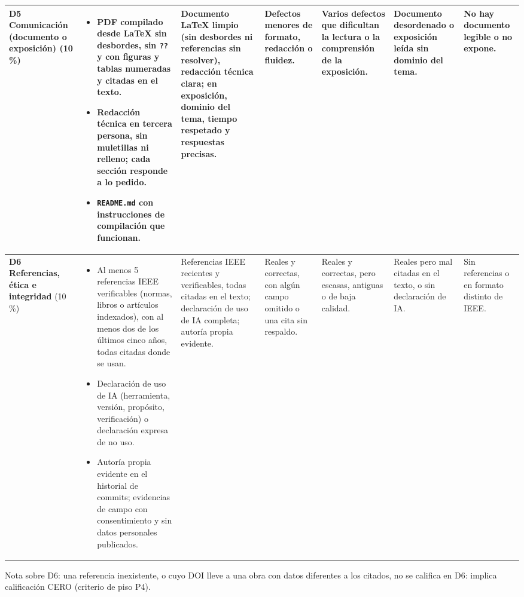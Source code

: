 \documentclass[11pt]{article}
\begin{document}
\begin{landscape}
{\begin{longtable}{|L{2.4cm}|L{5.6cm}|L{3.1cm}|L{2.8cm}|L{2.8cm}|L{2.7cm}|L{2.1cm}|}
	\textbf{D5 Comunicación (documento o exposición)} (10\,\%) & \begin{itemize}[leftmargin=9pt,itemsep=0pt,topsep=0pt,parsep=0pt,partopsep=0pt,after=\vspace{-\baselineskip}]\item PDF compilado desde \LaTeX{} sin desbordes, sin \texttt{??} y con figuras y tablas numeradas y citadas en el texto.\item Redacción técnica en tercera persona, sin muletillas ni relleno; cada sección responde a lo pedido.\item \texttt{README.md} con instrucciones de compilación que funcionan.\end{itemize} & Documento \LaTeX{} limpio (sin desbordes ni referencias sin resolver), redacción técnica clara; en exposición, dominio del tema, tiempo respetado y respuestas precisas. & Defectos menores de formato, redacción o fluidez. & Varios defectos que dificultan la lectura o la comprensión de la exposición. & Documento desordenado o exposición leída sin dominio del tema. & No hay documento legible o no expone.\\
	\hline
	\textbf{D6 Referencias, ética e integridad} (10\,\%) & \begin{itemize}[leftmargin=9pt,itemsep=0pt,topsep=0pt,parsep=0pt,partopsep=0pt,after=\vspace{-\baselineskip}]\item Al menos 5 referencias IEEE verificables (normas, libros o artículos indexados), con al menos dos de los últimos cinco años, todas citadas donde se usan.\item Declaración de uso de IA (herramienta, versión, propósito, verificación) o declaración expresa de no uso.\item Autoría propia evidente en el historial de commits; evidencias de campo con consentimiento y sin datos personales publicados.\end{itemize} & Referencias IEEE recientes y verificables, todas citadas en el texto; declaración de uso de IA completa; autoría propia evidente. & Reales y correctas, con algún campo omitido o una cita sin respaldo. & Reales y correctas, pero escasas, antiguas o de baja calidad. & Reales pero mal citadas en el texto, o sin declaración de IA. & Sin referencias o en formato distinto de IEEE.\\
	\hline
\end{longtable}
}
{\footnotesize Nota sobre D6: una referencia inexistente, o cuyo DOI lleve a una obra con datos diferentes a los citados, no se califica en D6: implica calificación CERO (criterio de piso P4).}
\end{landscape}
\end{document}
